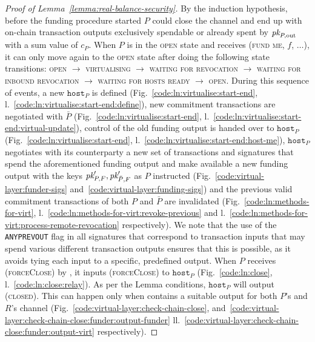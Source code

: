 \begin{proof}[Proof of Lemma~\ref{lemma:real-balance-security}]
  By the induction hypothesis, before the funding procedure started $P$ could
  close the channel and end up with on-chain transaction outputs exclusively
  spendable or already spent by $\textit{pk}_{P, \mathrm{out}}$ with a sum value of
  $c_P$. When $P$ is in the \textsc{open} state and receives (\textsc{fund me},
  $f$, $\dots$), it can only move again to the \textsc{open} state after doing
  the following state transitions: \textsc{open} $\rightarrow$
  \textsc{virtualising} $\rightarrow$ \textsc{waiting for revocation}
  $\rightarrow$ \textsc{waiting for inbound revocation} $\rightarrow$
  \textsc{waiting for hosts ready} $\rightarrow$ \textsc{open}. During this
  sequence of events, a new $\texttt{host}_P$ is defined
  (Fig.~\ref{code:ln:virtualise:start-end},
  l.~\ref{code:ln:virtualise:start-end:define}), new commitment transactions are
  negotiated with $\bar{P}$ (Fig.~\ref{code:ln:virtualise:start-end},
  l.~\ref{code:ln:virtualise:start-end:virtual-update}), control of the old
  funding output is handed over to $\texttt{host}_P$
  (Fig.~\ref{code:ln:virtualise:start-end},
  l.~\ref{code:ln:virtualise:start-end:host-me}), $\texttt{host}_P$ negotiates
  with its counterparty a new set of transactions and signatures that spend the
  aforementioned funding output and make available a new funding output with the
  keys $\textit{pk}_{P, F}', \textit{pk}_{\bar{P}, F}'$ as $P$ instructed
  (Fig.~\ref{code:virtual-layer:funder-sigs}
  and~\ref{code:virtual-layer:funding-sigs}) and the previous valid commitment
  transactions of both $P$ and $\bar{P}$ are invalidated
  (Fig.~\ref{code:ln:methods-for-virt},
  l.~\ref{code:ln:methods-for-virt:revoke-previous} and
  l.~\ref{code:ln:methods-for-virt:process-remote-revocation} respectively). We
  note that the use of the \texttt{ANYPREVOUT} flag in all signatures that
  correspond to transaction inputs that may spend various different transaction
  outputs ensures that this is possible, as it avoids tying each input to a
  specific, predefined output. When $P$ receives (\textsc{forceClose}) by
  \environment, it inputs (\textsc{forceClose}) to $\texttt{host}_P$
  (Fig.~\ref{code:ln:close}, l.~\ref{code:ln:close:relay}). As per the Lemma
  conditions, $\texttt{host}_P$ will output (\textsc{closed}). This can happen
  only when \ledger contains a suitable output for both $P$'s and $R$'s channel
  (Fig.~\ref{code:virtual-layer:check-chain-close},
  and~\ref{code:virtual-layer:check-chain-close:funder:output-funder}
  ll.~\ref{code:virtual-layer:check-chain-close:funder:output-virt}
  respectively).


\end{proof}
